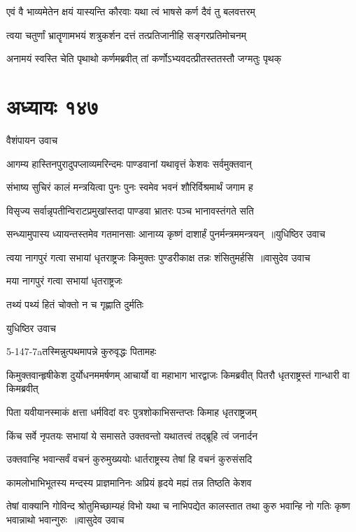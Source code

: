 \twolineshloka
{एवं वै भाव्यमेतेन क्षयं यास्यन्ति कौरवाः}
{यथा त्वं भाषसे कर्ण दैवं तु बलवत्तरम्}


\twolineshloka
{त्वया चतुर्णां भ्रातॄणामभयं शत्रुकर्शन}
{दत्तं तत्प्रतिजानीहि सङ्गरप्रतिमोचनम्}


\twolineshloka
{अनामयं स्वस्ति चेति पृथाथो कर्णमब्रवीत्}
{तां कर्णोऽभ्यवदत्प्रीतस्ततस्तौ जग्मतुः पृथक्}


\chapter{अध्यायः १४७}
\twolineshloka
{वैशंपायन उवाच}
{}


\twolineshloka
{आगम्य हास्तिनपुरादुपप्लाव्यमरिन्दमः}
{पाण्डवानां यथावृत्तं केशवः सर्वमुक्तवान्}


\twolineshloka
{संभाष्य सुचिरं कालं मन्त्रयित्वा पुनः पुनः}
{स्वमेव भवनं शौरिर्विश्रमार्थं जगाम ह}


\twolineshloka
{विसृज्य सर्वान्नृपतीन्विराटप्रमुखांस्तदा}
{पाण्डवा भ्रातरः पञ्च भानावस्तंगते सति}


\threelineshloka
{सन्ध्यामुपास्य ध्यायन्तस्तमेव गतमानसाः}
{आनाय्य कृष्णं दाशार्हं पुनर्मन्त्रममन्त्रयन् ॥युधिष्ठिर उवाच}
{}


\threelineshloka
{त्वया नागपुरं गत्वा सभायां धृतराष्ट्रजः}
{किमुक्तः पुण्डरीकाक्ष तन्नः शंसितुमर्हसि ॥वासुदेव उवाच}
{}


मया नागपुरं गत्वा सभायां धृतराष्ट्रजः

तथ्यं पथ्यं हितं चोक्तो न च गृह्णाति दुर्मतिः

युधिष्ठिर उवाच

5-147-7aतस्मिन्नुत्पथमापन्ने कुरुवृद्धः पितामहः

किमुक्तवान्हृषीकेश दुर्योधनममर्षणम्
\twolineshloka
{आचार्यो वा महाभाग भारद्वाजः किमब्रवीत्}
{पितरौ धृतराष्ट्रस्तं गान्धारी वा किमब्रवीत्}


\twolineshloka
{पिता यवीयानस्माकं क्षत्ता धर्मविदां वरः}
{पुत्रशोकाभिसन्तप्तः किमाह धृतराष्ट्रजम्}


\twolineshloka
{किंच सर्वे नृपतयः सभायां ये समासते}
{उक्तवन्तो यथातत्त्वं तद्ब्रूहि त्वं जनार्दन}


\twolineshloka
{उक्तवान्हि भवान्सर्वं वचनं कुरुमुख्ययोः}
{धार्तराष्ट्रस्य तेषां हि वचनं कुरुसंसदि}


\twolineshloka
{कामलोभाभिभूतस्य मन्दस्य प्राज्ञमानिनः}
{अप्रियं हृदये मह्यं तन्न तिष्ठति केशव}


\fourlineindentedshloka
{तेषां वाक्यानि गोविन्द श्रोतुमिच्छाम्यहं विभो}
{यथा च नाभिपद्येत कालस्तात तथा कुरु}
{भवान्हि नो गतिः कृष्ण भवान्नाथो भवान्गुरुः ॥वासुदेव उवाच}
{}


